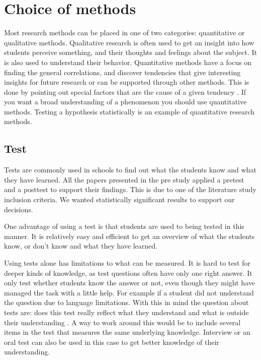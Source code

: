 \chapter{Choice of methods}
Most research methods can be placed in one of two categories: quantitative or qualitative methods. Qualitative research is often used to get an insight into how students perceive something, and their thoughts and feelings about the subject. It is also used to understand their behavior. Quantitative methods have a focus on finding the general correlations, and discover tendencies that give interesting insights for future research or can be supported through other methods. This is done by pointing out special factors that are the cause of a given tendency \cite{tjora2012kvalitative}. If you want a broad understanding of a phenomenon you should use quantitative methods. Testing a hypothesis statistically is an example of quantitative research methods. 

\section{Test}
Tests are commonly used  in schools to find out what the students know and what they have learned. All the papers presented in the pre study applied a pretest and a posttest to support their findings. This is due to one of the literature study inclusion criteria. We wanted statistically significant results to support our decisions. 

\bigskip\noindent
One advantage of using a test is that students are used to being tested in this manner. It is relatively easy and efficient to get an overview of what the students know, or don't know and what they have learned.

\bigskip\noindent
Using tests alone has limitations to what can be measured. It is hard to test for deeper kinds of knowledge, as test questions often have only one right answer. It only test whether students know the answer or not, even though they might have managed the task with a little help. For example if a student did not understand the question due to language limitations. With this in mind the question about tests are: does this test really reflect what they understand and what is outside their understanding \cite{andersen2009evaluering}. A way to work around this would be to include several items in the test that measures the same underlying knowledge. Interview or an oral test can also be used in this case to get better knowledge of their understanding.

